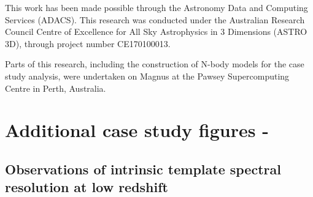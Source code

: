 \documentclass[
  journal=pasa,
  manuscript=research-paper, %
  year=2020,
  volume=37,
]{cup-journal}
\begin{document}
This work has been made possible through the Astronomy Data and Computing Services (ADACS).
This research was conducted under the Australian Research Council Centre of Excellence for All Sky Astrophysics in 3 Dimensions (ASTRO 3D), through project number CE170100013. 

Parts of this research, including the construction of N-body models for the case study analysis, were undertaken on Magnus at the Pawsey Supercomputing Centre in Perth, Australia. 




\appendix






\section{Additional case study figures - }
\subsection{Observations of intrinsic template spectral resolution at low redshift}
\label{app:cs1}
\end{document}
